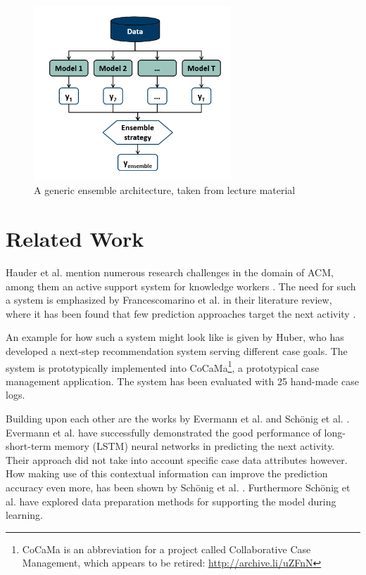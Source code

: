 \documentclass[%
	paper=A4,
	twoside=false,				%
	openright,					%
	parskip=full,				%
	chapterprefix=true,			%
	11pt,						%
	headings=normal,			%
	bibliography=totoc,			%
	listof=totoc,				%
	titlepage=on,				%
	captions=tableabove,		%
	draft=false,				%
]{scrreprt}
\begin{document}
\begin{figure}
    \centering
    \includegraphics[width=20em]{gfx/ensemble_architecture.png}
    \caption{A generic ensemble architecture, taken from lecture material \cite{lessmannBADS}}
    \label{fig:ensemble_architecture}
\end{figure}

\section*{Related Work}
Hauder et al. mention numerous research challenges in the domain of ACM, among them an active support system for knowledge workers \cite{hauder2014}.
The need for such a system is emphasized by Francescomarino et al. in their literature review, where it has been found that few prediction approaches target the next activity \cite{francescomarino2018}.

An example for how such a system might look like is given by Huber, who has developed a next-step recommendation system serving different case goals.
The system is prototypically implemented into CoCaMa\footnote{CoCaMa is an abbreviation for a project called Collaborative Case Management, which appears to be retired: \url{http://archive.li/uZFnN}}, a prototypical case management application. The system has been evaluated with 25 hand-made case logs.

Building upon each other are the works by Evermann et al. \cite{evermann2016} and Schönig et al. \cite{schoenig2018}.
Evermann et al. have successfully demonstrated the good performance of long-short-term memory (LSTM) neural networks in predicting the next activity.
Their approach did not take into account specific case data attributes however.
How making use of this contextual information can improve the prediction accuracy even more, has been shown by Schönig et al. \cite{schoenig2018}.
Furthermore Schönig et al. have explored data preparation methods for supporting the model during learning.
\end{document}
